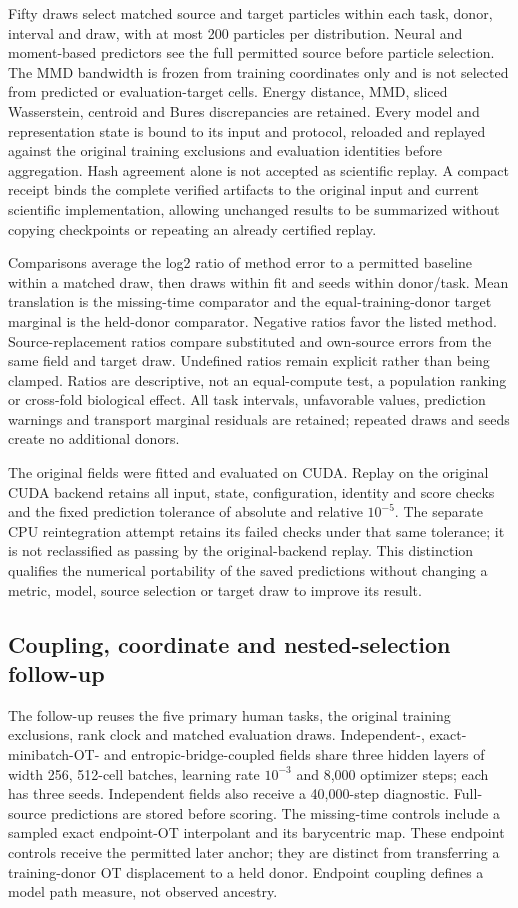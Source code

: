 \documentclass[10pt,a4paper]{article}
\begin{document}
Fifty draws select matched source and target particles within each task, donor, interval and draw, with at most 200 particles per distribution. Neural and moment-based predictors see the full permitted source before particle selection. The MMD bandwidth is frozen from training coordinates only and is not selected from predicted or evaluation-target cells. Energy distance, MMD, sliced Wasserstein, centroid and Bures discrepancies are retained. Every model and representation state is bound to its input and protocol, reloaded and replayed against the original training exclusions and evaluation identities before aggregation. Hash agreement alone is not accepted as scientific replay. A compact receipt binds the complete verified artifacts to the original input and current scientific implementation, allowing unchanged results to be summarized without copying checkpoints or repeating an already certified replay.

Comparisons average the log2 ratio of method error to a permitted baseline within a matched draw, then draws within fit and seeds within donor/task. Mean translation is the missing-time comparator and the equal-training-donor target marginal is the held-donor comparator. Negative ratios favor the listed method. Source-replacement ratios compare substituted and own-source errors from the same field and target draw. Undefined ratios remain explicit rather than being clamped. Ratios are descriptive, not an equal-compute test, a population ranking or cross-fold biological effect. All task intervals, unfavorable values, prediction warnings and transport marginal residuals are retained; repeated draws and seeds create no additional donors.

The original fields were fitted and evaluated on CUDA. Replay on the original CUDA backend retains all input, state, configuration, identity and score checks and the fixed prediction tolerance of absolute and relative $10^{-5}$. The separate CPU reintegration attempt retains its failed checks under that same tolerance; it is not reclassified as passing by the original-backend replay. This distinction qualifies the numerical portability of the saved predictions without changing a metric, model, source selection or target draw to improve its result.
\subsection{Coupling, coordinate and nested-selection follow-up}
The follow-up reuses the five primary human tasks, the original training exclusions, rank clock and matched evaluation draws. Independent-, exact-minibatch-OT- and entropic-bridge-coupled fields share three hidden layers of width 256, 512-cell batches, learning rate $10^{-3}$ and 8,000 optimizer steps; each has three seeds. Independent fields also receive a 40,000-step diagnostic. Full-source predictions are stored before scoring. The missing-time controls include a sampled exact endpoint-OT interpolant and its barycentric map. These endpoint controls receive the permitted later anchor; they are distinct from transferring a training-donor OT displacement to a held donor. Endpoint coupling defines a model path measure, not observed ancestry.
\end{document}
